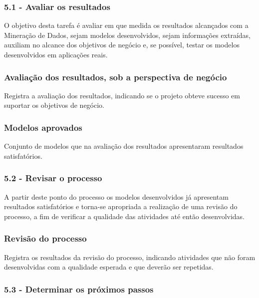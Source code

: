 
\subsubsection*{\textbf{5.1 - Avaliar os resultados}}

O objetivo desta tarefa é avaliar em que medida os resultados alcançados com a Mineração de Dados, sejam modelos desenvolvidos, sejam informações extraídas, auxiliam no alcance dos objetivos de negócio e, se possível, testar os modelos desenvolvidos em aplicações reais.

\subsubsection*{Avaliação dos resultados, sob a perspectiva de negócio}

Registra a avaliação dos resultados, indicando se o projeto obteve sucesso em suportar os objetivos de negócio.

\subsubsection*{Modelos aprovados}

Conjunto de modelos que na avaliação dos resultados apresentaram resultados satisfatórios.

\subsubsection*{\textbf{5.2 - Revisar o processo}}

A partir deste ponto do processo os modelos desenvolvidos já apresentam resultados satisfatórios e torna-se apropriada a realização de uma revisão do processo, a fim de verificar a qualidade das atividades até então desenvolvidas.

\subsubsection*{Revisão do processo}

Registra os resultados da revisão do processo, indicando atividades que não foram desenvolvidas com a qualidade esperada e que deverão ser repetidas.

\subsubsection*{\textbf{5.3 - Determinar os próximos passos}}

